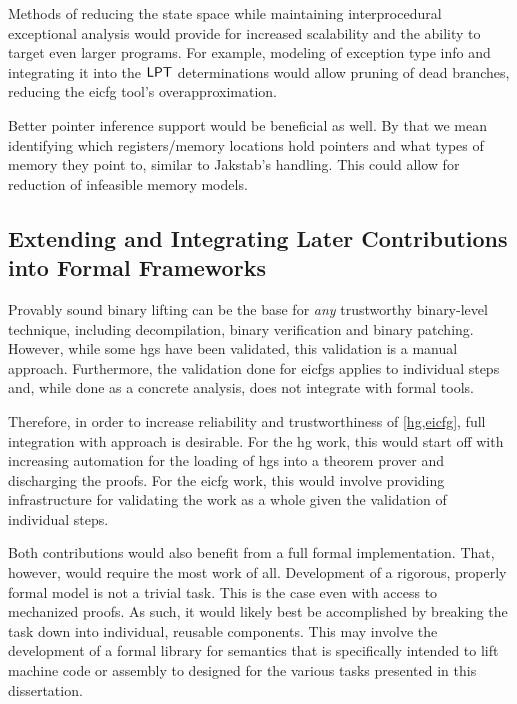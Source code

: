 Methods of reducing the state space while maintaining interprocedural exceptional analysis would provide for increased scalability and the ability to target even larger programs.
For example, modeling of exception type info and integrating it into the $\operatorname{\mathsf{LPT}}$ determinations would allow pruning of dead branches, reducing the \ac{eicfg} tool's overapproximation.

Better pointer inference support would be beneficial as well.
By that we mean identifying which registers/memory locations hold pointers and what types of memory they point to, similar to Jakstab's handling.
This could allow for reduction of infeasible memory models.

\subsection{Extending and Integrating Later Contributions into Formal Frameworks}
Provably sound binary lifting can be the base for \emph{any} trustworthy binary-level technique, including decompilation, binary verification and binary patching.
However, while some \acp{hg} have been validated, this validation is a manual approach.
Furthermore, the validation done for \acp{eicfg} applies to individual steps and, while done as a concrete analysis, does not integrate with formal tools.

Therefore, in order to increase reliability and trustworthiness of \cref{hg,eicfg}, full integration with  approach is desirable.
For the \ac{hg} work, this would start off with increasing automation for the loading of \acp{hg} into a theorem prover and discharging the proofs.
For the \ac{eicfg} work, this would involve providing  infrastructure for validating the work as a whole given the validation of individual steps.

Both contributions would also benefit from a full formal implementation.
That, however, would require the most work of all.
Development of a rigorous, properly formal model is not a trivial task.
This is the case even with access to mechanized proofs.
As such, it would likely best be accomplished by breaking the task down into individual, reusable components.
This may involve the development of a formal library for semantics that is specifically intended to lift machine code or assembly to  designed for the various tasks presented in this dissertation.
